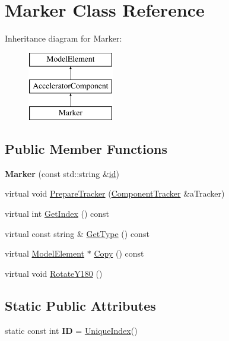 \hypertarget{classMarker}{}\section{Marker Class Reference}
\label{classMarker}
Inheritance diagram for Marker\+:\begin{figure}[H]
\begin{center}
\leavevmode
\includegraphics[height=3.000000cm]{classMarker}
\end{center}
\end{figure}
\subsection*{Public Member Functions}
\begin{DoxyCompactItemize}
\item 
\mbox{\label{classMarker_a4c656d101a6f402031e40328d96000a0}} 
{\bfseries Marker} (const std\+::string \&\hyperlink{classModelElement_aada171ead2085c75b592cf07d91bc5c2}{id})
\item 
virtual void \hyperlink{classMarker_a3910ebbb39ce13360e4dd53897c490ce}{Prepare\+Tracker} (\hyperlink{classComponentTracker}{Component\+Tracker} \&a\+Tracker)
\item 
virtual int \hyperlink{classMarker_a3453b35526a601d4c97d689b61f73454}{Get\+Index} () const
\item 
virtual const string \& \hyperlink{classMarker_a3fc5e5a8665da63bc18a28c604c71036}{Get\+Type} () const
\item 
virtual \hyperlink{classModelElement}{Model\+Element} $\ast$ \hyperlink{classMarker_a79a35a1eac386b87a456cbfff265c9ec}{Copy} () const
\item 
virtual void \hyperlink{classMarker_aa1e927fe0a2eea626759daec624c97f3}{Rotate\+Y180} ()
\end{DoxyCompactItemize}
\subsection*{Static Public Attributes}
\begin{DoxyCompactItemize}
\item 
\mbox{\label{classMarker_a4ade4412f174253602075f03b70e52fe}} 
static const int {\bfseries ID} = \hyperlink{classAcceleratorComponent_aa7ad4d39e1a488b705983842ed1ac784}{Unique\+Index}()
\end{DoxyCompactItemize}
